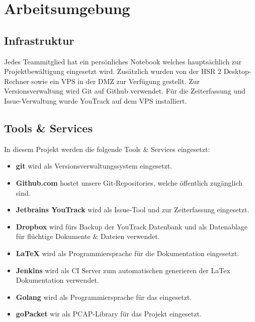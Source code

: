 \section{Arbeitsumgebung}
\label{sec:Arbeitsumgebung}

\subsection{Infrastruktur}
Jedes Teammitglied hat ein persönliches Notebook welches hauptsächlich zur Projektbewältigung eingesetzt wird. Zusätzlich wurden von der \acs{HSR} 2 Desktop-Rechner sowie ein \acs{VPS} in der DMZ zur Verfügung gestellt.
Zur Versionsverwaltung wird Git auf Github verwendet. Für die Zeiterfassung und Issue-Verwaltung wurde YouTrack auf dem \acs{VPS} installiert.

\subsection{Tools \& Services}
In diesem Projekt werden die folgende Tools \& Services eingesetzt:

\begin{itemize}
  \item \textbf{git} \newline wird als Versionsverwaltungssystem eingesetzt.
  \item \textbf{Github.com} \newline hostet unsere Git-Repositories, welche öffentlich zugänglich sind.
  \item \textbf{Jetbrains YouTrack} \newline wird als Issue-Tool und zur Zeiterfassung eingesetzt. 
  \item \textbf{Dropbox} \newline wird fürs Backup der YouTrack Datenbank und als Datenablage für flüchtige Dokumente \& Dateien verwendet.
  \item \textbf{\LaTeX} \newline wird als Programmiersprache für die Dokumentation eingesetzt.
  \item \textbf{Jenkins} \newline wird als \acl{CI} Server zum automatischen generieren der LaTex Dokumentation verwendet.
  \item \textbf{Golang} \newline wird als Programmiersprache für das \tool eingesetzt.
  \item \textbf{goPacket} \newline wir als \acs{PCAP}-Library für das Projekt eingesetzt.
\end{itemize}